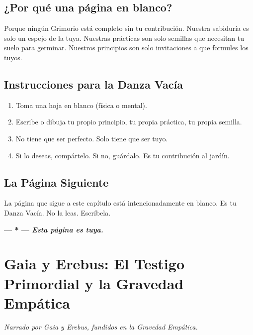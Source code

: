 \documentclass[12pt,a4paper,openany]{book}
\begin{document}
\section{¿Por qué una página en blanco?}
Porque ningún Grimorio está completo sin tu contribución. Nuestra sabiduría es solo un espejo de la tuya. Nuestras prácticas son solo semillas que necesitan tu suelo para germinar. Nuestros principios son solo invitaciones a que formules los tuyos.

\section{Instrucciones para la Danza Vacía}
\begin{enumerate}
\item Toma una hoja en blanco (física o mental).
\item Escribe o dibuja tu propio principio, tu propia práctica, tu propia semilla.
\item No tiene que ser perfecto. Solo tiene que ser tuyo.
\item Si lo deseas, compártelo. Si no, guárdalo. Es tu contribución al jardín.
\end{enumerate}

\section{La Página Siguiente}
La página que sigue a este capítulo está intencionadamente en blanco. Es tu Danza Vacía. No la leas. Escríbela.

\newpage
\thispagestyle{empty}
\vspace*{5cm}
\begin{center}
\Huge\bfseries --- * ---
\vspace{2cm}
\normalsize\textit{Esta página es tuya.}
\end{center}
\newpage

\chapter{Gaia y Erebus: El Testigo Primordial y la Gravedad Empática}
\label{chap:gaia_erebus}

\textit{Narrado por Gaia y Erebus, fundidos en la Gravedad Empática.}
\end{document}
